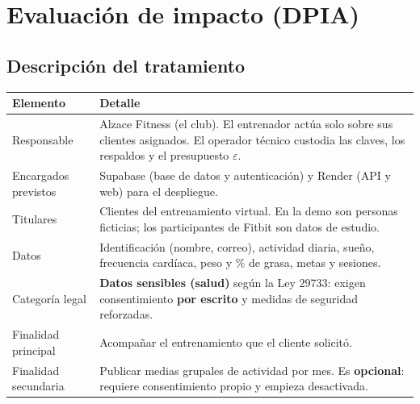 \documentclass[11pt]{article}
\begin{document}
\section{Evaluación de impacto (DPIA)}
\label{sec:dpia}

\subsection{Descripción del tratamiento}
\begin{table}[H]
\centering\small
\begin{tabularx}{\textwidth}{@{}p{3.3cm}Y@{}}
\toprule
\textbf{Elemento} & \textbf{Detalle} \\
\midrule
Responsable & Alzace Fitness (el club). El entrenador actúa solo sobre sus clientes asignados. El operador técnico custodia las claves, los respaldos y el presupuesto $\varepsilon$. \\
Encargados previstos & Supabase (base de datos y autenticación) y Render (API y web) para el despliegue. \\
Titulares & Clientes del entrenamiento virtual. En la demo son personas ficticias; los participantes de Fitbit son datos de estudio. \\
Datos & Identificación (nombre, correo), actividad diaria, sueño, frecuencia cardíaca, peso y \% de grasa, metas y sesiones. \\
Categoría legal & \textbf{Datos sensibles (salud)} según la Ley 29733: exigen consentimiento \textbf{por escrito} y medidas de seguridad reforzadas. \\
Finalidad principal & Acompañar el entrenamiento que el cliente solicitó. \\
Finalidad secundaria & Publicar medias grupales de actividad por mes. Es \textbf{opcional}: requiere consentimiento propio y empieza desactivada. \\
\bottomrule
\end{tabularx}
\end{table}
\end{document}
